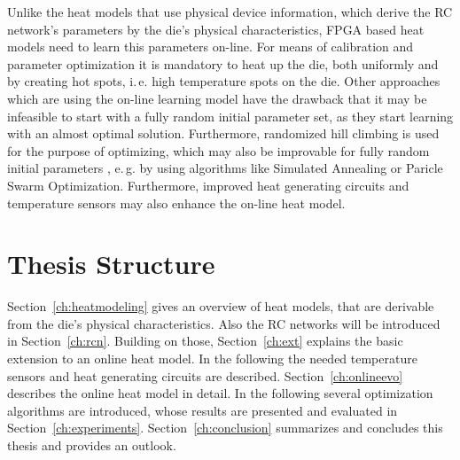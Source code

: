 Unlike the heat models that use physical device information, which derive the \ac{RC} network's parameters by the die's physical characteristics,
\ac{FPGA} based heat models need to learn this parameters on-line. For means of calibration and parameter optimization it is mandatory to heat up the die, both uniformly and by creating hot spots, i.\,e. high temperature spots on the die.
Other approaches which are using the on-line learning model have the drawback that it may be infeasible to start with a fully random initial parameter set, as they start learning with an almost optimal solution. Furthermore, randomized hill climbing is used for the purpose of optimizing, which may also be improvable for fully random initial parameters \cite{Happe}, e.\,g. by using algorithms like Simulated Annealing or Paricle Swarm Optimization. Furthermore, improved heat generating circuits \cite{Agne2013} and temperature sensors \cite{Ruthing2012} may also enhance the on-line heat model.

\section{Thesis Structure}
Section~\ref{ch:heatmodeling} gives an overview of heat models, that are derivable from the die's physical characteristics. Also the \ac{RC} networks will be introduced in Section~\ref{ch:rcn}. Building on those, Section~\ref{ch:ext} explains the basic extension to an online heat model. In the following the needed temperature sensors and heat generating circuits are described. 
Section~\ref{ch:onlineevo} describes the online heat model in detail. In the following several optimization algorithms are introduced, whose results are presented and evaluated in Section~\ref{ch:experiments}. 
Section~\ref{ch:conclusion} summarizes and concludes this thesis and provides an outlook.